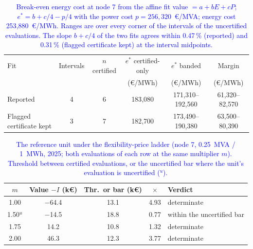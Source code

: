 \begin{table}[htbp!]
    \centering
    \caption{\textcolor{blue}{Break-even energy cost at node 7 from the affine fit value $= a + bE + cP$; $e^{*} = b + c/4 - p/4$ with the power cost $p = 256{,}320$~\euro/MVA; energy cost 253{,}880~\euro/MWh. Ranges are over every corner of the intervals of the uncertified evaluations. The slope $b + c/4$ of the two fits agrees within 0.47\,\% (reported) and 0.31\,\% (flagged certificate kept) at the interval midpoints.}}
    \label{tab:res_breakeven}
    \scriptsize\setlength{\tabcolsep}{3pt}
    \begin{tabular}{l c c c c c}
        \toprule
        Fit & Intervals & $n$ certified & $e^{*}$ certified-only & $e^{*}$ banded & Margin \\
            &           &               & (\euro/MWh)            & (\euro/MWh)    & (\euro/MWh) \\
        \midrule
        Reported                 & 4 & 6 & 183{,}080 & 171{,}310--192{,}560 & 61{,}320--82{,}570 \\
        Flagged certificate kept & 3 & 7 & 182{,}700 & 173{,}490--190{,}380 & 63{,}500--80{,}390 \\
        \bottomrule
    \end{tabular}
\end{table}

\begin{table}[htbp!]
    \centering
    \caption{\textcolor{blue}{The reference unit under the flexibility-price ladder (node 7, 0.25~MVA / 1~MWh, 2025; both evaluations of each row at the same multiplier $m$). Threshold between certified evaluations, or the uncertified bar where the unit's evaluation is uncertified ($^{u}$).}}
    \label{tab:res_flex_ladder}
    \scriptsize\setlength{\tabcolsep}{5pt}
    \begin{tabular}{c c c c l}
        \toprule
        $m$ & Value $- I$ (k\euro) & Thr.\ or bar (k\euro) & $\times$ & Verdict \\
        \midrule
        1.00       & $-$64.4 & 13.1 & 4.93 & determinate \\
        1.50$^{u}$ & $-$14.5 & 18.8 & 0.77 & within the uncertified bar \\
        1.75       & 14.2    & 10.8 & 1.32 & determinate \\
        2.00       & 46.3    & 12.3 & 3.77 & determinate \\
        \bottomrule
    \end{tabular}
\end{table}

